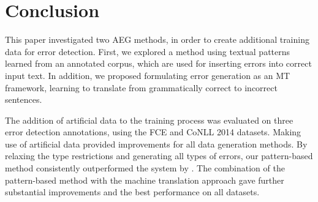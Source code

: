 \documentclass[11pt,letterpaper]{article}
\begin{document}
\section{Conclusion}

This paper investigated two AEG methods, in order to create additional training data for error detection.
First, we explored a method using textual patterns learned from an annotated corpus, which are used for inserting errors into correct input text.
In addition, we proposed formulating error generation as an MT framework, learning to translate from grammatically correct to incorrect sentences.

The addition of artificial data to the training process was evaluated on three error detection annotations, using the FCE and CoNLL 2014 datasets.
Making use of artificial data provided improvements for all data generation methods.
By relaxing the type restrictions and generating all types of errors, our pattern-based method consistently outperformed the system by .
The combination of the pattern-based method with the machine translation approach gave further substantial improvements and the best performance on all datasets.




\end{document}
